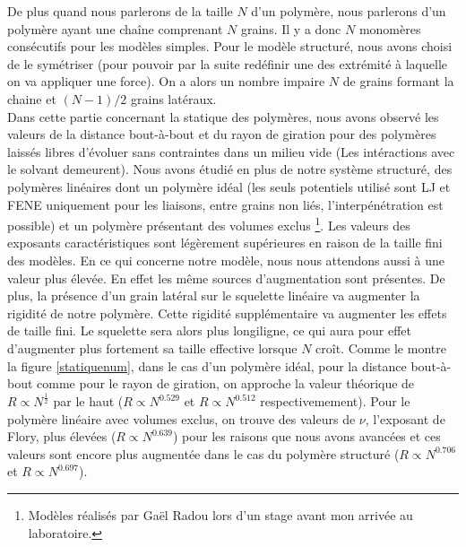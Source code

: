 De plus quand nous parlerons de la taille $N$ d'un polymère, nous parlerons d'un polymère ayant une chaîne comprenant $N$ grains. Il y a donc $N$ monomères consécutifs pour les modèles simples. Pour le modèle structuré, nous avons choisi de le symétriser (pour pouvoir par la suite redéfinir une des extrémité à laquelle on va appliquer une force). On a alors un nombre impaire $N$ de grains formant la chaine et $(N-1)/2$ grains latéraux.\\


Dans cette partie concernant la statique des polymères, nous avons observé les valeurs de la distance bout-à-bout et du rayon de giration pour des polymères laissés libres d'évoluer sans contraintes dans un milieu vide (Les intéractions avec le solvant demeurent). Nous avons étudié en plus de notre système structuré, des polymères linéaires dont un polymère idéal (les seuls potentiels utilisé sont LJ et FENE uniquement pour les liaisons, entre grains non liés, l'interpénétration est possible) et un polymère présentant des volumes exclus \footnote{Modèles réalisés par Gaël Radou lors d'un stage avant mon arrivée au laboratoire.}. Les valeurs des exposants caractéristiques sont légèrement supérieures en raison de la taille fini des modèles. En ce qui concerne notre modèle, nous nous attendons aussi à une valeur plus élevée. En effet les même sources d'augmentation sont présentes. De plus, la présence d'un grain latéral sur le squelette linéaire va augmenter la rigidité de notre polymère. Cette rigidité supplémentaire va augmenter les effets de taille fini. Le squelette sera alors plus longiligne, ce qui aura pour effet d'augmenter plus fortement sa taille effective lorsque $N$ croît. Comme le montre la figure  \ref{statiquenum}, dans le cas d'un polymère idéal, pour la distance bout-à-bout comme pour le rayon de giration, on approche la valeur théorique de $R\propto N^\frac{1}{2}$ par le haut ($R\propto N^{0.529}$ et $R\propto N^{0.512}$ respectivemement). Pour le polymère linéaire avec volumes exclus, on trouve des valeurs de $\nu$, l'exposant de Flory, plus élevées ($R \propto N^{0.639}$) pour les raisons que nous avons avancées et ces valeurs sont encore plus augmentée dans le cas du polymère structuré ($R\propto N^{0.706}$ et $R \propto N^{0.697}$). \\


